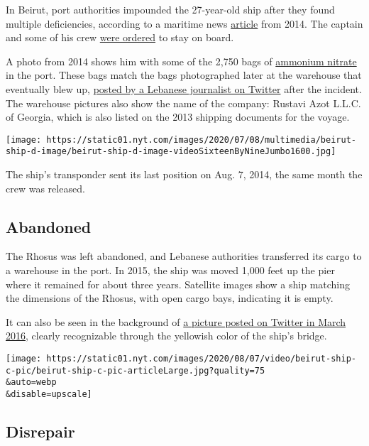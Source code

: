 In Beirut, port authorities impounded the 27-year-old ship after they
found multiple deficiencies, according to a maritime news
\href{https://www.fleetmon.com/maritime-news/2014/4194/crew-kept-hostages-floating-bomb-mv-rhosus-beirut/}{article}
from 2014. The captain and some of his crew
\href{https://www.nytimes.com/2020/08/05/world/middleeast/beirut-explosion-ship.html}{were
ordered} to stay on board.

A photo from 2014 shows him with some of the 2,750 bags of
\href{https://www.nytimes.com/2020/08/05/world/middleeast/beirut-explosion-ammonium-nitrate.html}{ammonium
nitrate} in the port. These bags match the bags photographed later at
the warehouse that eventually blew up,
\href{https://twitter.com/DimaSadek/status/1291486030458224640}{posted
by a Lebanese journalist on Twitter} after the incident. The warehouse
pictures also show the name of the company: Rustavi Azot L.L.C. of
Georgia, which is also listed on the 2013 shipping documents for the
voyage.

\texttt{[image: https://static01.nyt.com/images/2020/07/08/multimedia/beirut-ship-d-image/beirut-ship-d-image-videoSixteenByNineJumbo1600.jpg]}

The ship's transponder sent its last position on Aug. 7, 2014, the same
month the crew was released.

\hypertarget{abandoned}{%
\subsection{Abandoned}\label{abandoned}}

The Rhosus was left abandoned, and Lebanese authorities transferred its
cargo to a warehouse in the port. In 2015, the ship was moved 1,000 feet
up the pier where it remained for about three years. Satellite images
show a ship matching the dimensions of the Rhosus, with open cargo bays,
indicating it is empty.

It can also be seen in the background of
\href{https://archive.vn/6xqjc}{a picture posted on Twitter in March
2016}, clearly recognizable through the yellowish color of the ship's
bridge.

\texttt{[image: https://static01.nyt.com/images/2020/08/07/video/beirut-ship-c-pic/beirut-ship-c-pic-articleLarge.jpg?quality=75\\\&auto=webp\\\&disable=upscale]}

\hypertarget{disrepair}{%
\subsection{Disrepair}\label{disrepair}}

